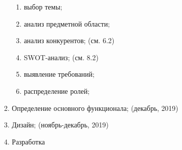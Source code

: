 \begin{enumerate}[I.]
\begin{enumerate}[1.]
		\begin{enumerate}[1.]
			\item выбор темы;
			\item анализ предметной области;
			\item анализ конкурентов; (см. 6.2)
			\item SWOT-анализ; (см. 8.2)
			\item выявление требований;
			\item распределение ролей;
		\end{enumerate}
		
		\item Определение основного функционала; (декабрь, 2019)
		
		\item Дизайн; (ноябрь-декабрь, 2019)
		
		\item Разработка
		

\end{enumerate}
\end{enumerate}
